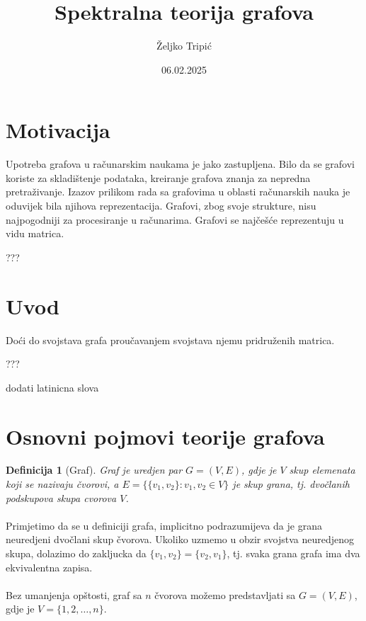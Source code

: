 \documentclass[11pt]{article}
\title{Spektralna teorija grafova}
\author{Željko Tripić}
\date{06.02.2025}
\newtheorem{definition}{Definicija}
\begin{document}
	\maketitle
	
	\section{Motivacija}
	Upotreba grafova u računarskim naukama je jako zastupljena. Bilo da se grafovi koriste za skladištenje podataka, 
	kreiranje grafova znanja za nepredna pretraživanje. Izazov prilikom rada sa grafovima u oblasti računarskih nauka je oduvijek
	bila njihova reprezentacija. Grafovi, zbog svoje strukture, nisu najpogodniji za procesiranje u računarima.
	Grafovi se najčešće reprezentuju u vidu matrica.

    ???
	
	\section{Uvod}
	Doći do svojstava grafa proučavanjem svojstava njemu pridruženih matrica. 

    ???

    dodati latinicna slova
	
	\section{Osnovni pojmovi teorije grafova}
	
		\begin{definition}[Graf]
		Graf je uredjen par $G = (V, E)$, gdje je $V$ skup elemenata koji se nazivaju čvorovi, a $E = \{ \{v_1, v_2\} : v_1, v_2 \in V \}$ je skup grana, tj. dvočlanih podskupova skupa cvorova $V$.
		\end{definition}
	
        \paragraph{}
        Primjetimo da se u definiciji grafa, implicitno podrazumijeva da je grana neuredjeni dvočlani skup čvorova. Ukoliko uzmemo u obzir svojstva neuredjenog skupa, dolazimo do zakljucka da $\{v_1,v_2\} = \{v_2, v_1\}$, tj. svaka grana grafa ima dva ekvivalentna zapisa.
    
        \paragraph{}
        Bez umanjenja opštosti, graf sa $n$ čvorova možemo predstavljati sa $G = (V, E)$, gdje je $V = \{1, 2, \dots, n\}$.
	
\end{document}
